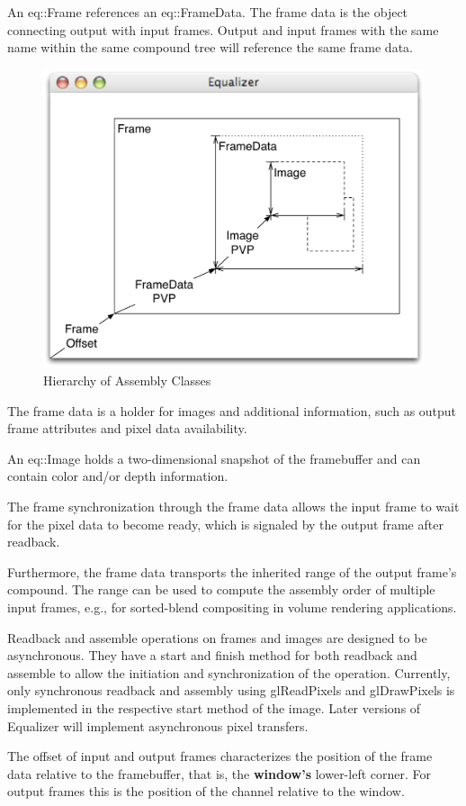 \documentclass[10pt,a4]{scrartcl}
\begin{document}
An \textsf{eq::Frame} references an \textsf{eq::Fra\-me\-Data}. The
frame data is the object connecting output with input frames. Output and
input frames with the same name within the same compound tree will
reference the same frame data.

\begin{figure}
  \includegraphics[width=.618\textwidth]{images/assembly.pdf}
  {\caption{\label{fAssembly}Hierarchy of Assembly Classes}}
\end{figure}
The frame data is a holder for images and additional information, such
as output frame attributes and pixel data availability.

An \textsf{eq::Image} holds a
two-dimensional snapshot of the framebuffer and can contain color and/or
depth information.

The frame synchronization through the frame data allows the input frame
to wait for the pixel data to become ready, which is signaled by the
output frame after readback.

Furthermore, the frame data transports the inherited range of the output
frame's compound. The range can be used to compute the assembly order of
multiple input frames, e.g., for sorted-blend compositing in volume
rendering applications.

Readback and assemble operations on frames and images are designed to be
asynchronous. They have a start and finish method for both readback and
assemble to allow the initiation and synchronization of the operation.
Currently, only synchronous readback and assembly using
\textsf{glReadPixels} and \textsf{glDrawPixels} is implemented in the
respective start method of the image. Later versions of Equalizer will
implement asynchronous pixel transfers.

The offset of input and output frames characterizes the position of the
frame data relative to the framebuffer, that is, the \textbf{window's}
lower-left corner. For output frames this is the position of the channel
relative to the window.
\end{document}
